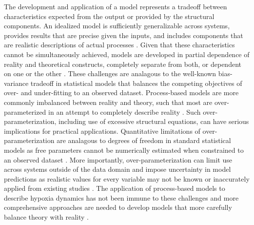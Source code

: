 \documentclass[letterpaper,12pt,oneside]{article}\usepackage[]{graphicx}\usepackage[]{color}
\begin{document}
The development and application of a model represents a tradeoff between characteristics expected from the output or provided by the structural components. An idealized model is sufficiently generalizable across systems, provides results that are precise given the inputs, and includes components that are realistic descriptions of actual processes \citep{Levins66}. Given that these characteristics cannot be simultaneously achieved, models are developed in partial dependence of reality and theoretical constructs, completely separate from both, or dependent on one or the other \citep{Morrison99,Ganju16}.  These challenges are analagous to the well-known bias-variance tradeoff in statistical models that balances the competing objectives of over- and under-fitting to an observed dataset. Process-based models are more commonly imbalanced between reality and theory, such that most are over-parameterized in an attempt to completely describe reality \citep{Denman03,Nossent12,Petrucci14}.  Such over-parameterization, including use of excessive structural equations, can have serious implications for practical applications.  Quantitative limitations of over-parameterization are analagous to degrees of freedom in standard statistical models as free parameters cannot be numerically estimated when constrained to an observed dataset \citep{Kirchner06}.  More importantly, over-parameterization can limit use across systems outside of the data domain and impose uncertainty in model predictions as realistic values for every variable may not be known or inaccurately applied from existing studies \citep{Durand02,Refsgaard07,Wade08}. The application of process-based models to describe hypoxia dynamics has not been immune to these challenges and more comprehensive approaches are needed to develop models that more carefully balance theory with reality \citep[e.g.,][]{Snowling01}.  
\end{document}
